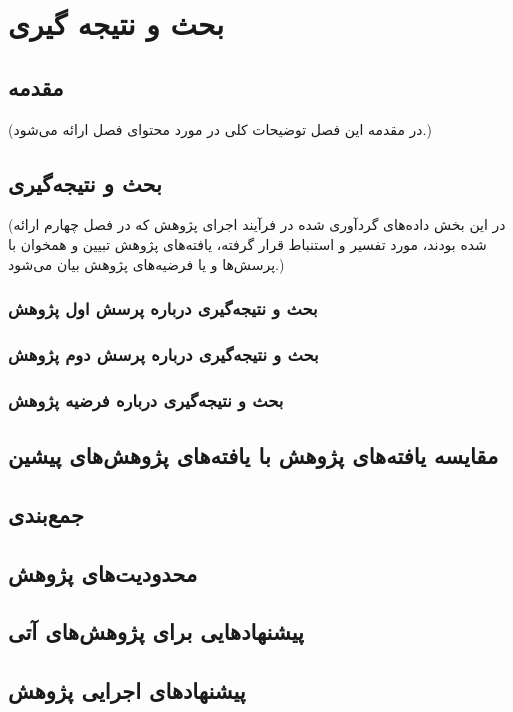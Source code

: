 \chapter{بحث و نتیجه‏ گیری}

\section{مقدمه}
(در مقدمه این فصل توضیحات کلی در مورد محتوای فصل ارائه می‌شود.)
\section{بحث و نتیجه‌گیری}
(در این بخش داده‌های گردآوری شده در فرآیند اجرای پژوهش که در فصل چهارم ارائه شده بودند، مورد تفسیر و استنباط قرار گرفته، یافته‌های پژوهش تبیین و همخوان با پرسش‌ها و یا فرضیه‌های پژوهش بیان می‌شود.)
\subsection{بحث و نتیجه‌گیری درباره پرسش اول پژوهش}
\subsection{بحث و نتیجه‌گیری درباره پرسش دوم پژوهش}
\subsection{بحث و نتیجه‌گیری درباره فرضیه پژوهش}
\section{مقایسه یافته‌های پژوهش با یافته‌های پژوهش‌های پیشین}
\section{جمع‌بندی}
\section{محدودیت‌های پژوهش}
\section{پیشنهاد‌هایی برای پژوهش‌های آتی}
\section{پیشنهاد‌های اجرایی پژوهش}


